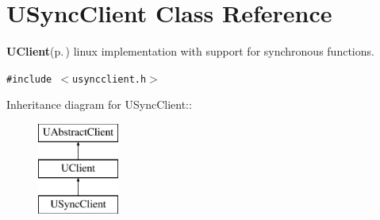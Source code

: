 \section{USync\-Client Class Reference}
\label{classUSyncClient}
{\bf UClient}{\rm (p.\,\pageref{classUClient})} linux implementation with support for synchronous functions.  


{\tt \#include $<$usyncclient.h$>$}

Inheritance diagram for USync\-Client::\begin{figure}[H]
\begin{center}
\leavevmode
\includegraphics[height=3cm]{classUSyncClient}
\end{center}
\end{figure}
